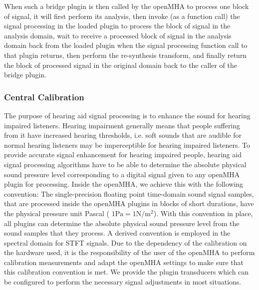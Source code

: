 When such a bridge plugin is then called by the openMHA to process one block of signal, it will first perform its analysis, then invoke (as a function call) the signal processing in the loaded plugin to process the block of signal in the analysis domain, wait to receive a processed block of signal in the analysis domain back from the loaded plugin when the signal processing function call to that plugin returns, then perform the re-\/synthesis transform, and finally return the block of processed signal in the original domain back to the caller of the bridge plugin.\subsubsection{Central Calibration}\label{index_clb}
The purpose of hearing aid signal processing is to enhance the sound for hearing impaired listeners. Hearing impairment generally means that people suffering from it have increased hearing thresholds, i.e. soft sounds that are audible for normal hearing listeners may be imperceptible for hearing impaired listeners. To provide accurate signal enhancement for hearing impaired people, hearing aid signal processing algorithms have to be able to determine the absolute physical sound pressure level corresponding to a digital signal given to any openMHA plugin for processing. Inside the openMHA, we achieve this with the following convention: The single-\/precision floating point time-\/domain sound signal samples, that are processed inside the openMHA plugins in blocks of short durations, have the physical pressure unit Pascal ( $1 \mathrm{Pa} = 1 \mathrm{N} / \mathrm{m}^2$). With this convention in place, all plugins can determine the absolute physical sound pressure level from the sound samples that they process. A derived convention is employed in the spectral domain for STFT signals. Due to the dependency of the calibration on the hardware used, it is the responsibility of the user of the openMHA to perform calibration measurements and adapt the openMHA settings to make sure that this calibration convention is met. We provide the plugin {\ttfamily transducers} which can be configured to perform the necessary signal adjustments in most situations. 
